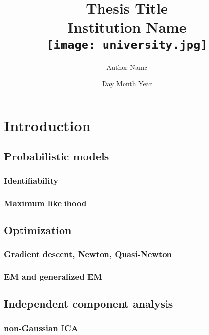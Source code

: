 \documentclass[12pt]{report}
\title{
  {Thesis Title}\\
  {\large Institution Name}\\
  {\texttt{[image: university.jpg]}}
}
\author{Author Name}
\date{Day Month Year}
\begin{document}




\tableofcontents

\chapter{Introduction}
\section{Probabilistic models}
\subsection{Identifiability}
\subsection{Maximum likelihood}
\section{Optimization}
\subsection{Gradient descent, Newton, Quasi-Newton}
\subsection{EM and generalized EM}
\section{Independent component analysis}
\subsection{non-Gaussian ICA}
\end{document}
